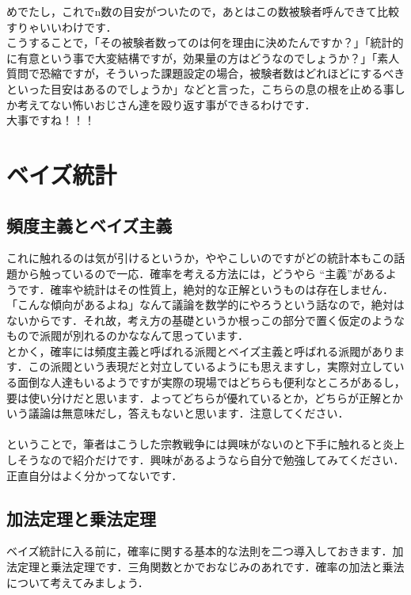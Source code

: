 \documentclass[11pt,a4paper]{ujreport} 	%
\begin{document}
めでたし，これでn数の目安がついたので，あとはこの数被験者呼んできて比較すりゃいいわけです．\\

こうすることで，「その被験者数ってのは何を理由に決めたんですか？」「統計的に有意という事で大変結構ですが，効果量の方はどうなのでしょうか？」「素人質問で恐縮ですが，そういった課題設定の場合，被験者数はどれほどにするべきといった目安はあるのでしょうか」などと言った，こちらの息の根を止める事しか考えてない怖いおじさん達を殴り返す事ができるわけです．\\

大事ですね！！！

\newpage
\chapter{ベイズ統計}
\section{頻度主義とベイズ主義}
これに触れるのは気が引けるというか，ややこしいのですがどの統計本もこの話題から触っているので一応．確率を考える方法には，どうやら ``主義''があるようです．確率や統計はその性質上，絶対的な正解というものは存在しません．「こんな傾向があるよね」なんて議論を数学的にやろうという話なので，絶対はないからです．それ故，考え方の基礎というか根っこの部分で置く仮定のようなもので派閥が別れるのかななんて思っています．\\

とかく，確率には頻度主義と呼ばれる派閥とベイズ主義と呼ばれる派閥があります．この派閥という表現だと対立しているようにも思えますし，実際対立している面倒な人達もいるようですが実際の現場ではどちらも便利なところがあるし，要は使い分けだと思います．よってどちらが優れているとか，どちらが正解とかいう議論は無意味だし，答えもないと思います．注意してください．\\
\\

ということで，筆者はこうした宗教戦争には興味がないのと下手に触れると炎上しそうなので紹介だけです．興味があるようなら自分で勉強してみてください．正直自分はよく分かってないです．

\section{加法定理と乗法定理}
ベイズ統計に入る前に，確率に関する基本的な法則を二つ導入しておきます．加法定理と乗法定理です．三角関数とかでおなじみのあれです．確率の加法と乗法について考えてみましょう．\\
\\
\end{document}
